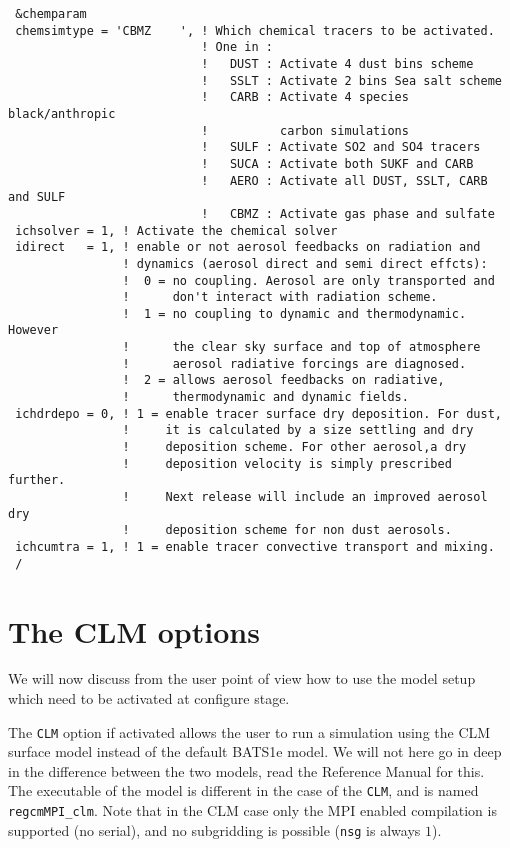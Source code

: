 {\footnotesize
\begin{Verbatim}
 &chemparam
 chemsimtype = 'CBMZ    ', ! Which chemical tracers to be activated.
                           ! One in :
                           !   DUST : Activate 4 dust bins scheme
                           !   SSLT : Activate 2 bins Sea salt scheme
                           !   CARB : Activate 4 species black/anthropic
                           !          carbon simulations
                           !   SULF : Activate SO2 and SO4 tracers
                           !   SUCA : Activate both SUKF and CARB
                           !   AERO : Activate all DUST, SSLT, CARB and SULF
                           !   CBMZ : Activate gas phase and sulfate
 ichsolver = 1, ! Activate the chemical solver
 idirect   = 1, ! enable or not aerosol feedbacks on radiation and
                ! dynamics (aerosol direct and semi direct effcts):
                !  0 = no coupling. Aerosol are only transported and
                !      don't interact with radiation scheme.
                !  1 = no coupling to dynamic and thermodynamic. However
                !      the clear sky surface and top of atmosphere 
                !      aerosol radiative forcings are diagnosed.
                !  2 = allows aerosol feedbacks on radiative,
                !      thermodynamic and dynamic fields.
 ichdrdepo = 0, ! 1 = enable tracer surface dry deposition. For dust,
                !     it is calculated by a size settling and dry
                !     deposition scheme. For other aerosol,a dry
                !     deposition velocity is simply prescribed further.
                !     Next release will include an improved aerosol dry
                !     deposition scheme for non dust aerosols.
 ichcumtra = 1, ! 1 = enable tracer convective transport and mixing.
 /
\end{Verbatim}
}

\section{The CLM options}
\label{clm}

We will now discuss from the user point of view how to use the model
setup which need to be activated at configure stage.

The \verb=CLM= option if activated allows the user to run a simulation using
the CLM surface model instead of the default BATS1e model. We will not here go
in deep in the difference between the two models, read the Reference Manual
for this.
The executable of the model is different in the case of the \verb=CLM=, and is
named \verb=regcmMPI_clm=.
Note that in the CLM case only the MPI enabled compilation is supported (no
serial), and no subgridding is possible (\verb=nsg= is always $1$).

